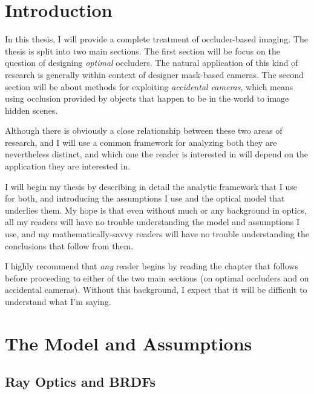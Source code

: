 \chapter{Introduction}

In this thesis, I will provide a complete treatment of occluder-based imaging. The thesis is split into two main sections. The first section will be focus on the question of designing \emph{optimal} occluders. The natural application of this kind of research is generally within context of designer mask-based cameras. The second section will be about methods for exploiting \emph{accidental cameras}, which means using occlusion provided by objects that happen to be in the world to image hidden scenes. 

Although there is obviously a close relationship between these two areas of research, and I will use a common framework for analyzing both they are nevertheless distinct, and which one the reader is interested in will depend on the application they are interested in.

I will begin my thesis by describing in detail the analytic framework that I use for both, and introducing the assumptions I use and the optical model that underlies them. My hope is that even without much or any background in optics, all my readers will have no trouble understanding the model and assumptions I use, and my mathematically-savvy readers will have no trouble understanding the conclusions that follow from them. 

I highly recommend that \emph{any} reader begins by reading the chapter that follows before proceeding to either of the two main sections (on optimal occluders and on accidental cameras). Without this background, I expect that it will be difficult to understand what I'm saying.

\chapter{The Model and Assumptions}

\section{Ray Optics and BRDFs \label{sec:rayoptics}}

